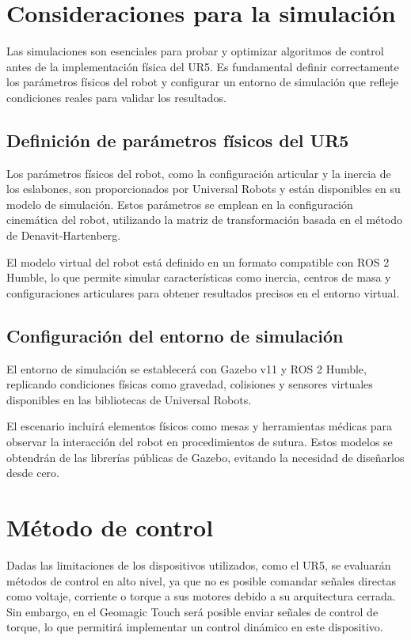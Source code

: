 \section{Consideraciones para la simulación}
Las simulaciones son esenciales para probar y optimizar algoritmos de control antes de la implementación física del UR5. Es fundamental definir correctamente los parámetros físicos del robot y configurar un entorno de simulación que refleje condiciones reales para validar los resultados.
    \subsection{Definición de parámetros físicos del UR5}
    
Los parámetros físicos del robot, como la configuración articular y la inercia de los eslabones, son proporcionados por Universal Robots y están disponibles en su modelo de simulación. Estos parámetros se emplean en la configuración cinemática del robot, utilizando la matriz de transformación basada en el método de Denavit-Hartenberg.

El modelo virtual del robot está definido en un formato compatible con ROS 2 Humble, lo que permite simular características como inercia, centros de masa y configuraciones articulares para obtener resultados precisos en el entorno virtual.

    \subsection{Configuración del entorno de simulación}
El entorno de simulación se establecerá con Gazebo v11 y ROS 2 Humble, replicando condiciones físicas como gravedad, colisiones y sensores virtuales disponibles en las bibliotecas de Universal Robots.

El escenario incluirá elementos físicos como mesas y herramientas médicas para observar la interacción del robot en procedimientos de sutura. Estos modelos se obtendrán de las librerías públicas de Gazebo, evitando la necesidad de diseñarlos desde cero.
\section{Método de control}
Dadas las limitaciones de los dispositivos utilizados, como el UR5, se evaluarán métodos de control en alto nivel, ya que no es posible comandar señales directas como voltaje, corriente o torque a sus motores debido a su arquitectura cerrada. Sin embargo, en el Geomagic Touch será posible enviar señales de control de torque, lo que permitirá implementar un control dinámico en este dispositivo.


